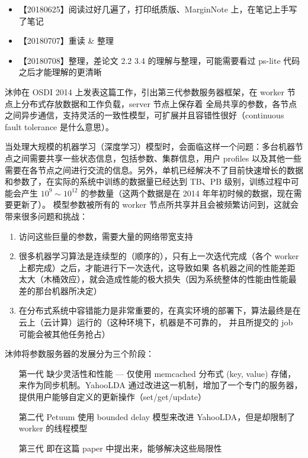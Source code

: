 \begin{itemize}
	\item 【20180625】阅读过好几遍了，打印纸质版、MarginNote 上，在笔记上手写了笔记
	\item 【20180707】重读 \& 整理
	\item 【20180708】整理，差论文 2.2 3.4 的理解与整理，可能需要看过 ps-lite 代码之后才能理解的更清晰
\end{itemize}

沐帅在 OSDI 2014 上发表这篇工作，引出第三代参数服务器框架，在 worker 节点上分布式存放数据和工作负载，server 节点上保存着
全局共享的参数，各节点之间异步通信，支持灵活的一致性模型，可扩展并且容错性很好（continuous fault tolerance 是什么意思）。

当处理大规模的机器学习（深度学习）模型时，会面临这样一个问题：多台机器节点之间需要共享一些状态信息，包括参数、集群信息，用户 profiles
以及其他一些需要在各节点之间进行交流的信息。另外，单机已经解决不了目前快速增长的数据和参数了，在实际的系统中训练的数据量已经达到 TB、PB
级别，训练过程中可能会产生 $10^9 \sim 10^{12}$ 的参数量（这两个数据是在 2014 年年初时候的数据，现在需要更新了）。%
模型参数被所有的 worker 节点所共享并且会被频繁访问到，这就会带来很多问题和挑战：
\begin{enumerate}
	\item 访问这些巨量的参数，需要大量的网络带宽支持
	\item 很多机器学习算法是连续型的（顺序的），只有上一次迭代完成（各个 worker 上都完成）之后，才能进行下一次迭代，这导致如果
	各机器之间的性能差距太大（木桶效应），就会造成性能的极大损失（因为系统整体的性能由性能最差的那台机器所决定）
	\item 在分布式系统中容错能力是非常重要的，在真实环境的部署下，算法最终是在云上（云计算）运行的（这种环境下，机器是不可靠的，
	并且所提交的 job 可能会被其他任务抢占）
\end{enumerate}

沐帅将参数服务器的发展分为三个阶段：
\begin{itemize}
	\item [第一代] 缺少灵活性和性能 --- 仅使用 memcached 分布式 (key, value) 存储，来作为同步机制。YahooLDA
	通过改进这一机制，增加了一个专门的服务器，提供用户能够自定义的更新操作（set/get/update）
	\item [第二代] Petuum 使用 bounded delay 模型来改进 YahooLDA，但是却限制了 worker 的线程模型
	\item [第三代] 即在这篇 paper 中提出来，能够解决这些局限性
\end{itemize}

